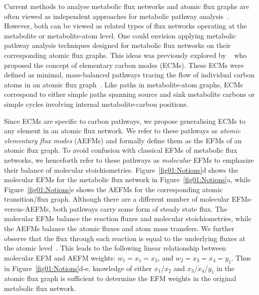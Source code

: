 \documentclass[12pt]{article}
\begin{document}
Current methods to analyse metabolic flux networks and atomic flux graphs
are often viewed as independent approaches for metabolic pathway
analysis~\citep{deFigueiredoLuisF.2009Csbp,AlgfoorZeyadAbd2017Iomp}.
However, both can be viewed as related types of flux networks operating at
the metabolite or metabolite-atom level. One could envision applying
metabolic pathway analysis techniques designed for metabolic flux networks
on their corresponding atomic flux graphs. This ideas was previously
explored by \citeauthor{PeyJon2011Defm}~\citep{PeyJon2011Defm} who proposed
the concept of elementary carbon modes (ECMs). These ECMs were defined as
minimal, mass-balanced pathways tracing the flow of individual carbon
atoms in an atomic flux graph~\citep{PeyJon2011Defm,PeyJon2012Itmd}. Like
paths in metabolite-atom graphs, ECMs correspond to either simple paths
spanning source and sink metabolite carbons or simple cycles involving
internal metabolite-carbon positions.



Since ECMs are specific to carbon pathways, we propose generalising ECMs
to any element in an atomic flux network. We refer to these pathways as
\emph{atomic elementary flux modes} (AEFMs) and formally define them as
the EFMs of an atomic flux graph. To avoid confusion with classical EFMs
of metabolic flux networks, we henceforth refer to these pathways as
\emph{molecular} EFMs to emphasize their balance of molecular
stoichiometries. Figure~\ref{fig01:Notions}d shows the molecular EFMs for
the metabolic flux network in Figure~\ref{fig01:Notions}a, while
Figure~\ref{fig01:Notions}e shows the AEFMs for the corresponding atomic
transition/flux graph. Although there are a different number of molecular
EFMs-versus-AEFMs, both pathways carry some form of steady state flux. The
molecular EFMs balance the reaction fluxes and molecular stoichiometries,
while the AEFMs balance the atomic fluxes and atom mass transfers. We
further observe that the flux through each reaction is equal to the
underlying fluxes at the atomic level~\citep{PeyJon2012Itmd}. This leads
to the following linear relationship between molecular EFM and AEFM
weights: $w_1 = x_1 = x_2$, and $w_2 = x_3 = x_4 = y_1$. Thus in
Figure~\ref{fig01:Notions}d-e, knowledge of either $x_1$/$x_2$ and
$x_3$/$x_4$/$y_1$ in the atomic flux graph is sufficient to determine the
EFM weights in the original metabolic flux network.
\end{document}
